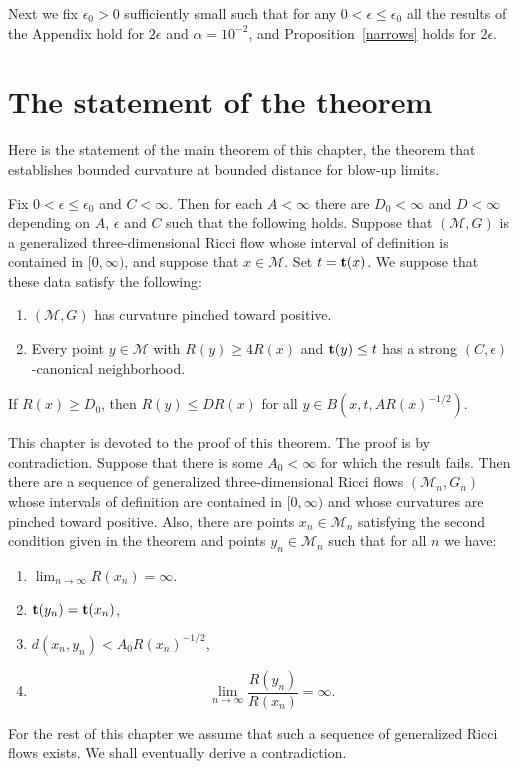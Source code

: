 Next we fix $\epsilon_0>0$ sufficiently small such that for any
$0<\epsilon\le \epsilon_0$ all the results of the Appendix hold for
$2\epsilon$ and $\alpha=10^{-2}$, and Proposition~\ref{narrows}
holds for $2\epsilon$.


\section{The statement of the theorem}

Here is the statement of the main theorem of this chapter, the
theorem that establishes bounded curvature at bounded distance for
blow-up limits.

\begin{theorem}
\label{thm:bounded-curvature-bounded-distance}
\label{bcbd}
Fix $0<\epsilon\le \epsilon_0$ and  $C<\infty$. Then for each
$A<\infty$ there are $D_0<\infty$ and $D<\infty$ depending on $A$,
$\epsilon$ and $C$ such that the following holds. Suppose that
$({\mathcal M},G)$ is a generalized three-dimensional Ricci flow
whose interval of definition is contained in $[0,\infty)$, and
suppose that $x\in {\mathcal M}$. Set $t={\bf t}(x)$. We suppose
that these data satisfy the following:
\begin{enumerate}
\item[(1)] $({\mathcal M},G)$ has curvature pinched toward positive.
\item[(2)] Every point $y\in{\mathcal  M}$ with
$R(y)\ge 4R(x)$  and ${\bf t}(y)\le t$ has a strong
$(C,\epsilon)$-canonical neighborhood.
\end{enumerate}
If $R(x)\ge D_0$, then $R(y)\le DR(x)$ for all $y\in
B(x,t,AR(x)^{-1/2})$.
\end{theorem}


This chapter is devoted to the proof of this theorem. The proof is
by contradiction. Suppose that there is some $A_0<\infty$ for which
the result fails. Then there are a sequence of generalized
three-dimensional Ricci flows $({\mathcal M}_n,G_n)$  whose
intervals of definition are contained in $[0,\infty)$ and whose
curvatures are pinched toward positive. Also, there are points
$x_n\in {\mathcal M}_n$ satisfying the second condition given in the
theorem and points $y_n\in {\mathcal M}_n$ such that for all $n$ we
have:
\begin{enumerate}
\item[(1)] $\lim_{n\rightarrow\infty}R(x_n)=\infty$.
\item[(2)] ${\bf t}(y_n)={\bf t}(x_n)$,
\item[(3)] $d(x_n,y_n)< A_0R(x_n)^{-1/2}$,
\item[(4)] $$\lim_{n\rightarrow\infty}\frac{R(y_n)}{R(x_n)}=\infty.$$
\end{enumerate}
For the rest of this chapter we assume that such a sequence of
generalized Ricci flows exists. We shall eventually derive a
contradiction.

